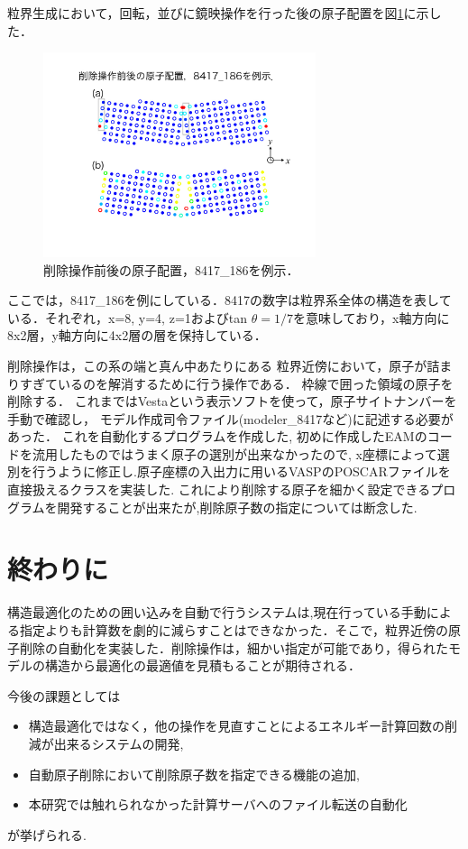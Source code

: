 \documentclass[a4j,twocolumn]{jsarticle}
\begin{document}
粒界生成において，回転，並びに鏡映操作を行った後の原子配置を図\ref{fig:delete_operation}に示した．
\begin{figure}[htbp]
\begin{center}
\includegraphics[width=80mm]{auto_delete_002.jpeg}
\caption{削除操作前後の原子配置，8417\_186を例示．}
\label{fig:delete_operation}
\end{center}
\end{figure}

ここでは，8417\_186を例にしている．8417の数字は粒界系全体の構造を表している．それぞれ，x=8,
y=4, z=1およびtan
\(\theta=1/7\)を意味しており，x軸方向に8x2層，y軸方向に4x2層の層を保持している．

削除操作は，この系の端と真ん中あたりにある
粒界近傍において，原子が詰まりすぎているのを解消するために行う操作である．
枠線で囲った領域の原子を削除する．
これまではVestaという表示ソフトを使って，原子サイトナンバーを手動で確認し，
モデル作成司令ファイル(modeler\_8417など)に記述する必要があった．
これを自動化するプログラムを作成した,
初めに作成したEAMのコードを流用したものではうまく原子の選別が出来なかったので,
x座標によって選別を行うように修正し.原子座標の入出力に用いるVASPのPOSCARファイルを直接扱えるクラスを実装した.
これにより削除する原子を細かく設定できるプログラムを開発することが出来たが,削除原子数の指定については断念した.


\section{終わりに}
構造最適化のための囲い込みを自動で行うシステムは,現在行っている手動による指定よりも計算数を劇的に減らすことはできなかった．そこで，粒界近傍の原子削除の自動化を実装した．削除操作は，細かい指定が可能であり，得られたモデルの構造から最適化の最適値を見積もることが期待される．

今後の課題としては
\begin{itemize}
\item 構造最適化ではなく，他の操作を見直すことによるエネルギー計算回数の削減が出来るシステムの開発,
\item 自動原子削除において削除原子数を指定できる機能の追加,
\item 本研究では触れられなかった計算サーバへのファイル転送の自動化
\end{itemize}
が挙げられる.
\end{document}
